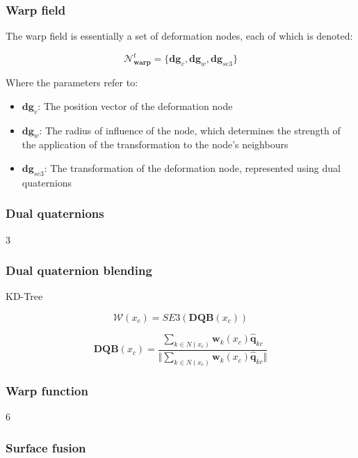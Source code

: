 \documentclass[a4paper]{article}
\begin{document}
\subsubsection{Warp field}

The warp field is essentially a set of deformation nodes, each of which is denoted:

$$\mathcal{N}^t_{\textbf{warp}}=\{ \textbf{dg}_v, \textbf{dg}_w, \textbf{dg}_{se3} \}$$

Where the parameters refer to:

\begin{itemize}
\item $\textbf{dg}_v$: The position vector of the deformation node

\item $\textbf{dg}_w$: The radius of influence of the node, which determines the strength of the application of the transformation to the node's neighbours

\item $\textbf{dg}_{se3}$: The transformation of the deformation node, represented using dual quaternions
\end{itemize}


\subsubsection{Dual quaternions}

3


\subsubsection{Dual quaternion blending}

KD-Tree

$$\mathcal{W}(x_c) = SE3(\textbf{DQB}(x_c))$$

$$\textbf{DQB}(x_c) = \frac{\sum_{k \in N(x_c)} \textbf{w}_k(x_c)\hat{\textbf{q}}_{kc}}{\Vert \sum_{k \in N(x_c)} \textbf{w}_k(x_c)\hat{\textbf{q}}_{kc} \Vert}$$

\subsubsection{Warp function}

6

\subsubsection{Surface fusion}
\end{document}
